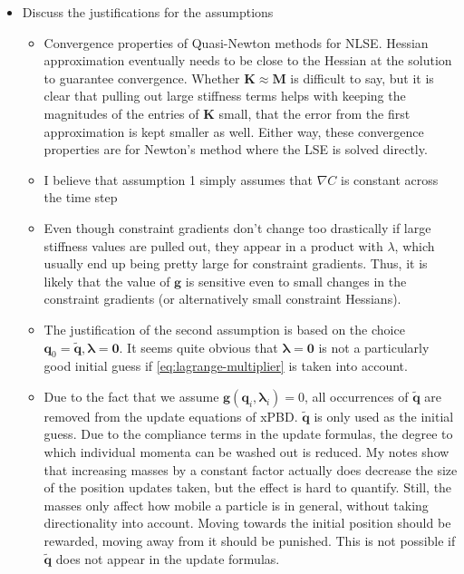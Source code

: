 \begin{itemize}
    \item Discuss the justifications for the assumptions
        \begin{itemize}
            \item Convergence properties of Quasi-Newton methods for NLSE. Hessian approximation eventually needs to be close to the Hessian at the solution
                to guarantee convergence. Whether $\bm{K} \approx \bm{M}$ is difficult to say, but it is clear that pulling out large stiffness terms helps
                with keeping the magnitudes of the entries of $\bm{K}$ small, that the error from the first approximation is kept smaller as well. Either way,
                these convergence properties are for Newton's method where the LSE is solved directly. 
            \item I believe that assumption 1 simply assumes that $\nabla C$ is constant across the time step
            \item Even though constraint gradients don't change too drastically if large stiffness values are pulled out, they appear in a product with 
                $\lambda$, which usually end up being pretty large for constraint gradients. Thus, it is likely that the value of $\bm{g}$ is sensitive
                even to small changes in the constraint gradients (or alternatively small constraint Hessians).
            \item The justification of the second assumption is based on the choice $\bm{q}_0 = \bm{\tilde{q}}, \bm{\lambda} = \bm{0}$. It seems quite obvious
                that $\bm{\lambda} = \bm{0}$ is not a particularly good initial guess if \cref{eq:lagrange-multiplier} is taken into account.
            \item Due to the fact that we assume $\bm{g}(\bm{q}_i, \bm{\lambda}_i) = 0$, all occurrences of $\bm{\tilde{q}}$ are removed from the update
                equations of xPBD. $\bm{\tilde{q}}$ is only used as the initial guess. Due to the compliance terms in the update formulas, the degree to
                which individual momenta can be washed out is reduced. My notes show that increasing masses by a constant factor actually does decrease the
                size of the position updates taken, but the effect is hard to quantify. Still, the masses only affect how mobile a particle is in general,
                without taking directionality into account. Moving towards the initial position should be rewarded, moving away from it should be punished.
                This is not possible if $\bm{\tilde{q}}$ does not appear in the update formulas.

\end{itemize}
\end{itemize}
